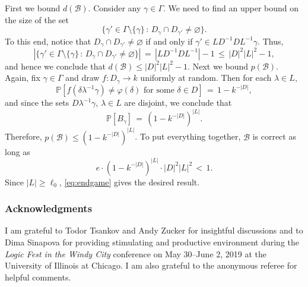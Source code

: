 \documentclass[11pt, reqno, psamsfonts]{amsart}
\theoremstyle{bfnote}
\theoremstyle{claim}
\theoremstyle{definition}
\theoremstyle{remark}
\newcommand{\0}{\varnothing}
\newcommand{\set}[1]{\{#1\}}
\renewcommand{\phi}{\varphi}
\renewcommand{\leq}{\leqslant}
\renewcommand{\geq}{\geqslant}
\renewcommand{\G}{\Gamma}
\newcommand{\B}{{\mathscr{B}}}
\renewcommand{\P}{\mathbb{P}}
\numberwithin{equation}{section}
\begin{document}
	First we bound $d(\B)$. Consider any $\gamma \in \G$. We need to find an upper bound on the size of the set
	\[
		\set{\gamma' \in \G \setminus \set{\gamma} \,:\, D_\gamma \cap D_{\gamma'} \neq \0}.
	\]
	To this end, notice that $D_\gamma \cap D_{\gamma'} \neq \0$ if and only if $\gamma' \in LD^{-1}DL^{-1}\gamma$. Thus,
	\[
		 \left|\set{\gamma' \in \G \setminus \set{\gamma} \,:\, D_\gamma \cap D_{\gamma'} \neq \0}\right| \,=\, |LD^{-1}DL^{-1}| - 1 \,\leq\, |D|^2|L|^2 - 1,
	\]
	and hence we conclude that $d(\B) \leq |D|^2|L|^2 - 1$. Next we bound $p(\B)$. Again, fix $\gamma \in \G$ and draw $f \colon D_\gamma \to k$ uniformly at random. Then for each $\lambda \in L$,
	\[
		\P[f(\delta \lambda^{-1} \gamma) \neq \phi(\delta) \text{ for some } \delta \in D] \,=\, 1 - k^{-|D|},
	\]
	and since the sets $D \lambda^{-1}\gamma$, $\lambda \in L$ are disjoint, we conclude that
	\[
		\P[B_\gamma] \,=\, (1 - k^{-|D|})^{|L|}.
	\]
	Therefore, $p(\B) \leq (1 - k^{-|D|})^{|L|}$. To put everything together, $\B$ is correct as long as
	\[
		e \cdot (1 - k^{-|D|})^{|L|} \cdot |D|^2|L|^2 \,<\, 1.
	\]
	Since $|L| \geq \ell_0$, \eqref{eq:endgame} gives the desired result.
	
	\subsubsection*{Acknowledgments} I am grateful to Todor Tsankov and Andy Zucker for insightful discussions and to Dima Sinapova for providing stimulating and productive environment during the \emph{Logic Fest in the Windy City} conference on May 30--June 2, 2019 at the University of Illinois at Chicago. I am also grateful to the anonymous referee for helpful comments.
	
	
	\printbibliography
\end{document}
